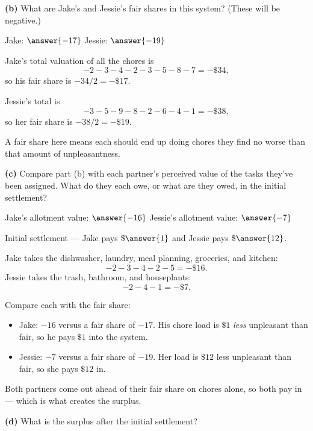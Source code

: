 \documentclass[12pt]{ximera}
\begin{document}
\begin{problem}
\begin{prompt}
\textbf{(b)} What are Jake's and Jessie's fair shares in this system? (These will be
negative.)

Jake: $\answer{-17}$ \qquad Jessie: $\answer{-19}$

\begin{solution}
Jake's total valuation of all the chores is
\[ -2-3-4-2-3-5-8-7 = -\$34, \]
so his fair share is $-34/2 = -\$17$.

Jessie's total is
\[ -3-5-9-8-2-6-4-1 = -\$38, \]
so her fair share is $-38/2 = -\$19$.

A fair share here means each should end up doing chores they find no worse than that
amount of unpleasantness.
\end{solution}
\end{prompt}

\begin{prompt}
\textbf{(c)} Compare part (b) with each partner's perceived value of the tasks they've
been assigned. What do they each owe, or what are they owed, in the initial settlement?

Jake's allotment value: $\answer{-16}$ \qquad Jessie's allotment value: $\answer{-7}$

\smallskip
Initial settlement --- Jake pays $\$\answer{1}$ and Jessie pays $\$\answer{12}$.

\begin{solution}
Jake takes the dishwasher, laundry, meal planning, groceries, and kitchen:
\[ -2-3-4-2-5 = -\$16. \]
Jessie takes the trash, bathroom, and houseplants:
\[ -2-4-1 = -\$7. \]

Compare each with the fair share:
\begin{itemize}
\item Jake: $-16$ versus a fair share of $-17$. His chore load is $\$1$ \emph{less}
      unpleasant than fair, so he pays $\$1$ into the system.
\item Jessie: $-7$ versus a fair share of $-19$. Her load is $\$12$ less unpleasant
      than fair, so she pays $\$12$ in.
\end{itemize}
Both partners come out ahead of their fair share on chores alone, so both pay in ---
which is what creates the surplus.
\end{solution}
\end{prompt}

\begin{prompt}
\textbf{(d)} What is the surplus after the initial settlement?


\end{prompt}
\end{problem}
\end{document}
